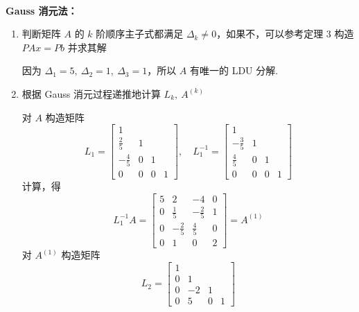              \begin{solution}
                \\ \textbf{Gauss 消元法：}
                \begin{enumerate}
                    \item 判断矩阵 $A$ 的 $k$ 阶顺序主子式都满足 $\Delta_k \ne 0$，如果不，可以参考定理 $3$ 构造 $PAx = Pb$ 并求其解
                        \par 因为 $\Delta_1 = 5, \ \Delta_2 = 1, \ \Delta_3 = 1$，所以 $A$ 有唯一的 LDU 分解.
                    \item 根据 Gauss 消元过程递推地计算 $L_k, \ A^{(k)}$
                        \par 对 $A$ 构造矩阵 
                        \begin{equation*}
                            L_1 = \begin{bmatrix}
                                1 & & & \\ \frac{2}{5} & 1 & & \\ -\frac{4}{5} & 0 & 1 & \\ 0 & 0 & 0 & 1
                            \end{bmatrix}, \quad L_1^{-1} = \begin{bmatrix}
                                1 & & & \\ -\frac{3}{5} & 1 &  & \\ \frac{4}{5} & 0 & 1 & \\ 0 & 0 & 0 & 1
                            \end{bmatrix}
                        \end{equation*}
                        计算，得 
                        \begin{equation*}
                            L_1^{-1}A = \begin{bmatrix}
                                5 & 2 & -4 & 0 \\ 0 & \frac{1}{5} & -\frac{2}{5} & 1 \\ 0 & -\frac{2}{5} & \frac{4}{5} & 0 \\ 0 & 1 & 0 & 2
                            \end{bmatrix} = A^{(1)}
                        \end{equation*}
                        对 $A^{(1)}$ 构造矩阵 
                        \begin{equation*}
                            L_2 = \begin{bmatrix}
                                1 & & & \\ 0 & 1 & & \\ 0 & -2 & 1 & \\ 0 & 5 & 0 & 1

\end{bmatrix}
\end{equation*}
\end{enumerate}
\end{solution}
